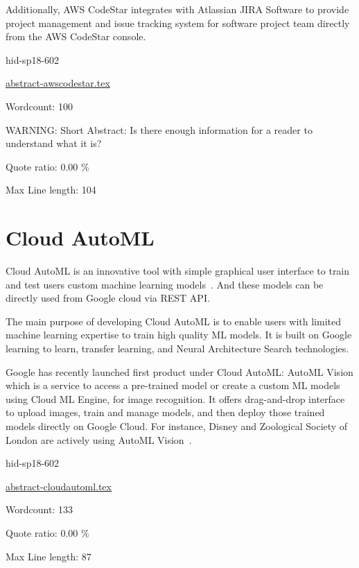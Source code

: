 Additionally, AWS CodeStar integrates with Atlassian JIRA Software to 
provide project management and issue tracking system for software project 
team directly from the AWS CodeStar console\cite{hid-sp18-602-www-awscodestar-blog}.



\begin{IU}

hid-sp18-602

\href{https://github.com/cloudmesh-community/hid-sp18-602/blob/master//technology/abstract-awscodestar.tex}{abstract-awscodestar.tex}

 

Wordcount: 100

WARNING: Short Abstract: Is there enough information for a reader to understand what it is?


Quote ratio: 0.00 \%
 
Max Line length: 104
\end{IU}

\section{Cloud AutoML}

Cloud AutoML is an innovative tool with simple graphical user interface to train
and test users custom machine learning models~\cite{hid-sp18-602-www-cloudautoml-main}.
And these models can be directly used from Google cloud via REST API. 

The main purpose of developing Cloud AutoML is to enable users with limited 
machine learning expertise to train high quality ML models. It is built on Google
learning to learn, transfer learning, and Neural Architecture Search 
technologies.

Google has recently launched first product under Cloud AutoML: AutoML Vision 
which is a service to access a pre-trained model or create a custom ML models using
Cloud ML Engine, for image recognition. It offers drag-and-drop interface to 
upload images, train and manage models, and then deploy those trained models 
directly on Google Cloud. For instance, Disney and Zoological Society of London are
actively using AutoML Vision~\cite{hid-sp18-602-wwww-cloudautoml-blog}.



\begin{IU}

hid-sp18-602

\href{https://github.com/cloudmesh-community/hid-sp18-602/blob/master//technology/abstract-cloudautoml.tex}{abstract-cloudautoml.tex}

 

Wordcount: 133


Quote ratio: 0.00 \%
 
Max Line length: 87
\end{IU}

